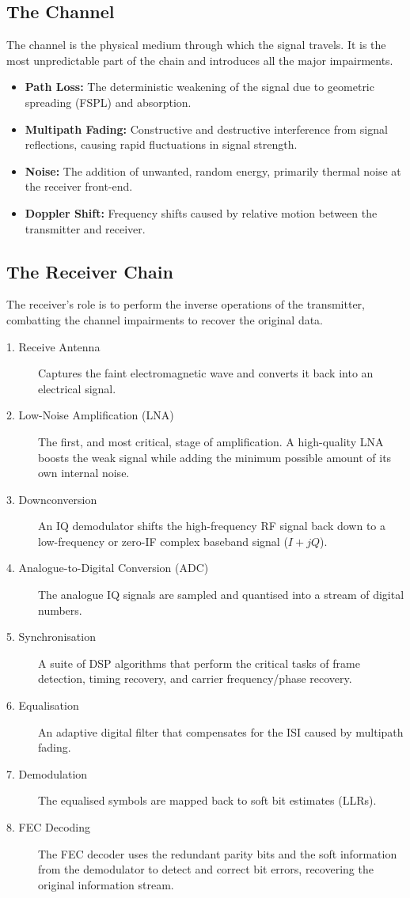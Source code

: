 \subsection{The Channel}

The channel is the physical medium through which the signal travels. It is the most unpredictable part of the chain and introduces all the major impairments.
\begin{itemize}
    \item \textbf{Path Loss:} The deterministic weakening of the signal due to geometric spreading (FSPL) and absorption.
    \item \textbf{Multipath Fading:} Constructive and destructive interference from signal reflections, causing rapid fluctuations in signal strength.
    \item \textbf{Noise:} The addition of unwanted, random energy, primarily thermal noise at the receiver front-end.
    \item \textbf{Doppler Shift:} Frequency shifts caused by relative motion between the transmitter and receiver.
\end{itemize}


\subsection{The Receiver Chain}

The receiver's role is to perform the inverse operations of the transmitter, combatting the channel impairments to recover the original data.

\begin{description}
    \item[1. Receive Antenna] Captures the faint electromagnetic wave and converts it back into an electrical signal.
    \item[2. Low-Noise Amplification (LNA)] The first, and most critical, stage of amplification. A high-quality LNA boosts the weak signal while adding the minimum possible amount of its own internal noise.
    \item[3. Downconversion] An IQ demodulator shifts the high-frequency RF signal back down to a low-frequency or zero-IF complex baseband signal ($I+jQ$).
    \item[4. Analogue-to-Digital Conversion (ADC)] The analogue IQ signals are sampled and quantised into a stream of digital numbers.
    \item[5. Synchronisation] A suite of DSP algorithms that perform the critical tasks of frame detection, timing recovery, and carrier frequency/phase recovery.
    \item[6. Equalisation] An adaptive digital filter that compensates for the ISI caused by multipath fading.
    \item[7. Demodulation] The equalised symbols are mapped back to soft bit estimates (LLRs).
    \item[8. FEC Decoding] The FEC decoder uses the redundant parity bits and the soft information from the demodulator to detect and correct bit errors, recovering the original information stream.
\end{description}


